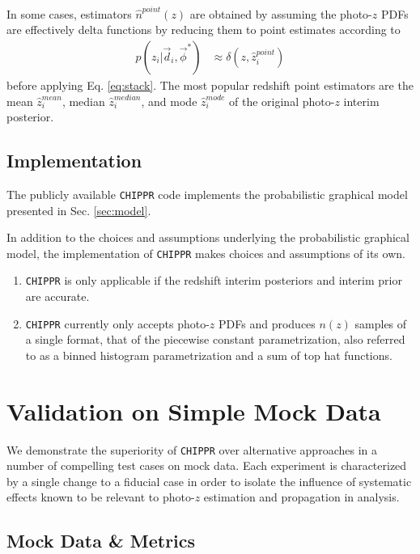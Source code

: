 \documentclass[iop]{emulateapj}
\newcommand{\chippr}{\texttt{CHIPPR} }
\begin{document}
In some cases, estimators $\hat{n}^{point}(z)$ are obtained by assuming the photo-$z$ PDFs are effectively delta functions by reducing them to point estimates according to
\begin{align}
\label{eq:delta}
p(z_{i} | \vec{d}_{i}, \vec{\phi}^{*}) &\approx \delta(z, \hat{z}_{i}^{point})
\end{align}
before applying Eq. \ref{eq:stack}.  The most popular redshift point estimators are the mean $\hat{z}^{mean}_{i}$, median $\hat{z}^{median}_{i}$, and mode $\hat{z}^{mode}_{i}$ of the original photo-$z$ interim posterior.

\subsection{Implementation}
\label{sec:implementation}

The publicly available \chippr code implements the probabilistic graphical model presented in Sec. \ref{sec:model}.  

In addition to the choices and assumptions underlying the probabilistic graphical model, the implementation of \chippr makes choices and assumptions of its own.

\begin{enumerate}
	\item \chippr is only applicable if the redshift interim posteriors and interim prior are accurate.
	\item \chippr currently only accepts photo-$z$ PDFs and produces $n(z)$ samples of a single format, that of the piecewise constant parametrization, also referred to as a binned histogram parametrization and a sum of top hat functions.
\end{enumerate}

\section{Validation on Simple Mock Data}
\label{sec:validation}

We demonstrate the superiority of \chippr over alternative approaches in a number of compelling test cases on mock data.  Each experiment is characterized by a single change to a fiducial case in order to isolate the influence of systematic effects known to be relevant to photo-$z$ estimation and propagation in analysis.  

\subsection{Mock Data \& Metrics}
\label{sec:validintro}
\end{document}
